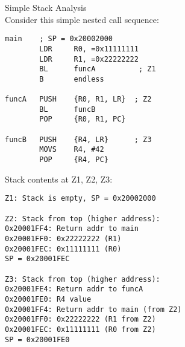 \begin{example2}{Simple Stack Analysis}\\
Consider this simple nested call sequence:

\begin{lstlisting}[language=armasm, style=basesmol]
main    ; SP = 0x20002000
        LDR     R0, =0x11111111
        LDR     R1, =0x22222222
        BL      funcA          ; Z1
        B       endless

funcA   PUSH    {R0, R1, LR}  ; Z2
        BL      funcB
        POP     {R0, R1, PC}

funcB   PUSH    {R4, LR}      ; Z3
        MOVS    R4, #42
        POP     {R4, PC}
\end{lstlisting}

Stack contents at Z1, Z2, Z3:

\begin{lstlisting}[style=basesmol]
Z1: Stack is empty, SP = 0x20002000

Z2: Stack from top (higher address):           
0x20001FF4: Return addr to main
0x20001FF0: 0x22222222 (R1)
0x20001FEC: 0x11111111 (R0)
SP = 0x20001FEC

Z3: Stack from top (higher address):
0x20001FE4: Return addr to funcA
0x20001FE0: R4 value
0x20001FF4: Return addr to main (from Z2)
0x20001FF0: 0x22222222 (R1 from Z2)
0x20001FEC: 0x11111111 (R0 from Z2)
SP = 0x20001FE0
\end{lstlisting}
\end{example2}